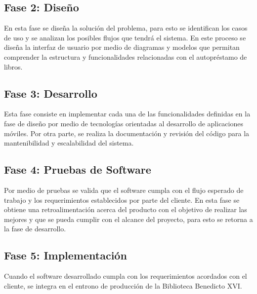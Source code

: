 \documentclass[spanish]{ieee_upb}
\begin{document}
\subsection*{Fase 2: Diseño}

En esta fase se diseña la solución del problema, para esto se identifican los casos de uso y se analizan los posibles flujos que tendrá el sistema. En este proceso se diseña la interfaz de usuario por medio de diagramas y modelos que permitan comprender la estructura y funcionalidades relacionadas con el autopréstamo de libros. 


\subsection*{Fase 3: Desarrollo}

Esta fase consiste en implementar cada una de las funcionalidades definidas en la fase de diseño por medio de tecnologías orientadas al desarrollo de aplicaciones móviles. Por otra parte, se realiza la documentación y revisión del código para la mantenibilidad y escalabilidad del sistema. 

\subsection*{Fase 4: Pruebas de Software}

Por medio de pruebas se valida que el software cumpla con el flujo esperado de trabajo y los requerimientos establecidos por parte del cliente. En esta fase se obtiene una retroalimentación acerca del producto con el objetivo de realizar las mejores y que se pueda cumplir con el alcance del proyecto, para esto se retorna a la fase de desarrollo. 

\subsection*{Fase 5: Implementación}

Cuando el software desarrollado cumpla con los requerimientos acordados con el cliente, se integra en el entrono de producción de la Biblioteca Benedicto XVI.
\end{document}
